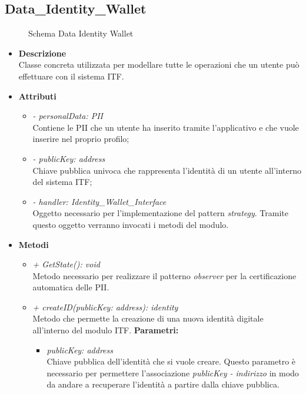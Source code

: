 \subsection{Data\_Identity\_Wallet}
\begin{figure}[!h]
	\centering
	\caption{Schema Data Identity Wallet}
\end{figure}
\begin{itemize}
	\item \textbf{Descrizione}\\
	Classe concreta utilizzata per modellare tutte le operazioni che un utente può effettuare con il sistema \gls{ITF}.
	\item \textbf{Attributi}
	\begin{itemize}
		\item \textit{- personalData: PII}\\
		Contiene le \gls{PII} che un utente ha inserito tramite l'applicativo e che vuole inserire nel proprio profilo;
		\item \textit{- publicKey: address}\\
		Chiave pubblica univoca che rappresenta l'identità di un utente all'interno del sistema \gls{ITF};
		\item \textit{- handler: Identity\_Wallet\_Interface}\\
		Oggetto necessario per l'implementazione del pattern \textit{strategy}. Tramite questo oggetto verranno invocati i metodi del modulo.
	\end{itemize}
	\item \textbf{Metodi}
	\begin{itemize}
		\item \textit{+ GetState(): void}\\
		Metodo necessario per realizzare il patterno \textit{observer} per la certificazione automatica delle \gls{PII}.
		\item \textit{+ createID(publicKey: address): identity}\\
		Metodo che permette la creazione di una nuova identità digitale all'interno del modulo \gls{ITF}.
		\textbf{Parametri:}
		\begin{itemize}
			\item \textit{publicKey: address}\\
			Chiave pubblica dell'identità che si vuole creare. Questo parametro è necessario per permettere l'associazione \textit{publicKey - indirizzo} in modo da andare a recuperare l'identità a partire dalla chiave pubblica.

\end{itemize}
\end{itemize}
\end{itemize}
